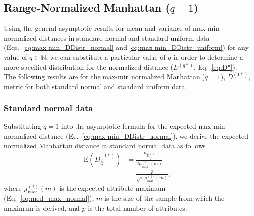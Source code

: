 \documentclass[aos]{imsart}
\begin{document}
\subsection{Range-Normalized Manhattan \texorpdfstring{($q=1$)}{}}

Using the general asymptotic results for mean and variance of max-min normalized distances in standard normal and standard uniform data (Eqs.~\ref{eq:max-min_DDistr_normal} and \ref{eq:max-min_DDistr_uniform}) for any value of $q \in \mathbb{N}$, we can substitute a particular value of $q$ in order to determine a more specified distribution for the normalized distance ($D^{(q*)}$, Eq.~\ref{eq:D*}). The following results are for the max-min normalized Manhattan ($q = 1$), $D^{(1*)}$, metric for both standard normal and standard uniform data.

\subsubsection{Standard normal data}

Substituting $q=1$ into the asymptotic formula for the expected max-min normalized distance (Eq.~\ref{eq:max-min_DDistr_normal}), we derive the expected normalized Manhattan distance in standard normal data as follows
%
\begin{equation}\label{eq:max-min_mean_normal_manhattan}
\begin{aligned}
\text{E}\left(D^{(1*)}_{ij}\right) &= \frac{\mu_{D^{(1)}_{ij}}}{2\mu^{(1)}_\text{max}(m)} \\
&= \frac{p}{\sqrt{\pi}\mu^{(1)}_\text{max}(m)},
\end{aligned}
\end{equation}
%
where $\mu^{(1)}_\text{max}(m)$ is the expected attribute maximum (Eq.~\ref{eq:med_max_normal}), $m$ is the size of the sample from which the maximum is derived, and $p$ is the total number of attributes.
\end{document}
